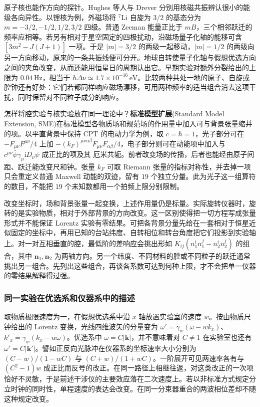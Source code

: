 原子核也能作方向的探针。Hughes 等人与 Drever 分别用核磁共振辨认很小的能级各向异性。以锂核为例，外磁场将 $^7\mathrm{Li}$ 自旋为 $3/2$ 的基态分为 $m=-3/2,-1/2,1/2,3/2$ 四级。普通 Zeeman 能量正比于 $mB$，三个相邻跃迁的频率应相等。若另有相对于星空固定的四极扰动，沿磁场量子化轴的能移可含 $[3m^2-J(J+1)]$ 一项。于是 $|m|=3/2$ 的两级一起移动，$|m|=1/2$ 的两级向另一方向移动，原来的一条共振线便可分开。地球自转使量子化轴与假想优选方向之间的夹角改变，从而还能用恒星日的周期认出它。早期实验对额外分裂给出的上限为 $0.04\,\mathrm{Hz}$，相当于 $h\Delta\nu\simeq1.7\times10^{-16}\,\mathrm{eV}$。比较两种共处一地的原子、自旋或腔钟还有好处：它们若都同样响应磁场漂移，可用两种频率的适当组合消去这项干扰，同时保留对不同粒子成分的响应。

怎样将腔实验与核实验放在同一理论中？\textbf{标准模型扩展}(Standard Model Extension, SME)在标准模型各物质场和规范场的作用量中加入可与背景张量缩并的项。以平直背景中保持 CPT 的电动力学为例，取 $c=\hbar=1$，光子部分可在 $-F_{\mu\nu}F^{\mu\nu}/4$ 上加
$-(k_F)^{\mu\nu\alpha\beta}F_{\mu\nu}F_{\alpha\beta}/4$，电子部分则可在动能项中加入与 $c^{\mu\nu}\bar\psi\gamma_\mu \mathrm{i}D_\nu\psi$ 成正比的项及其 厄米共轭。前者改变场的传播，后者也能经由原子间距、跃迁能改变尺和钟。张量 $k_F$ 可取 Riemann 张量的指标对称性，并去掉一项只会重定义普通 Maxwell 动能的双迹，留有 $19$ 个独立分量。此为光子这一组算符的数目，不能把 $19$ 个未知数都用一个拍频上限分别限制。

改变坐标时，场和背景张量一起变换，上述作用量仍是标量。实际旋转仪器时，旋转的是实验物质，相对于外部背景的方向改变。这一区别使得把一切方程写成张量形式并不能保证 Lorentz 实验有零结果。可把各背景分量先给在一套相对于恒星近似固定的坐标中，再用已知的台站纬度、自转相位和转台角度把它们投影到实验轴上。对一对互相垂直的腔，最低阶的差响应会挑出形如 $K_{ij}(n_1^in_1^j-n_2^in_2^j)$ 的组合，其中 $\bm n_1,\bm n_2$ 为两轴方向。另一个纬度、不同材料的腔或不同粒子的跃迁通常挑出另一组合。先列出这些组合，再谈各系数可达到何种上限，才不会把单一仪器的零结果解释得过强。

\subsubsection{同一实验在优选系和仪器系中的描述}

取物质极限速度为一，在假想优选系中沿 $x$ 轴放置实验室的速度 $w$。按由物质尺钟给出的 Lorentz 变换，光线四维波矢的分量变为 $\omega'=\gamma_w(\omega-wk_x)$、$k'_x=\gamma_w(k_x-w\omega)$。优选系中 $\omega=C|\bm k|$，并不意味着对 $C\ne1$ 在实验室也还有 $\omega'=C|\bm k'|$。譬如正反向光脉冲在仪器系的坐标速率大小分别为 $(C-w)/(1-wC)$ 与 $(C+w)/(1+wC)$。一阶展开可见两速率各有与 $(C^2-1)w$ 成正比而反号的改正。在同一路径上相继往返，对这类改正的一次项恰好不灵敏，于是前述干涉仪的主要效应落在二次速度上。若以非标准方式规定分立时钟的同时性，单程速度的表达会改变。在同一分束器重合的两波相位差却不随这种规定改变。

